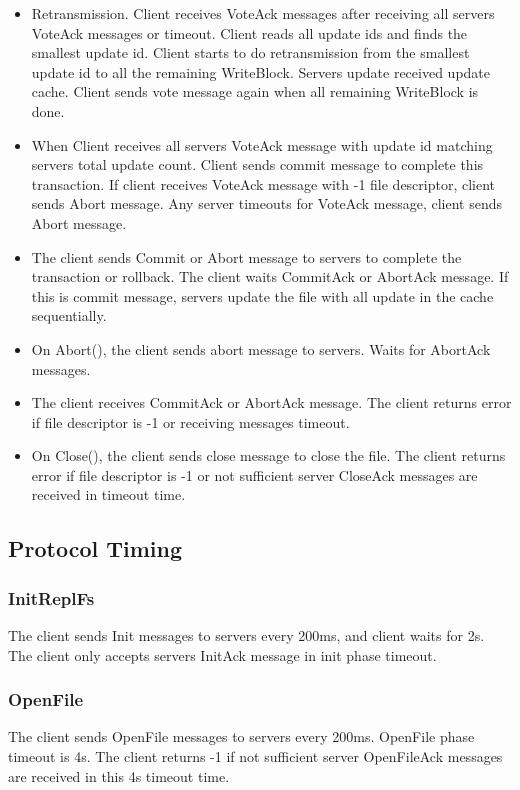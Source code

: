 \documentclass[12pt,fleqn]{article}
\begin{document}
\begin{itemize}
	\item Retransmission. Client receives VoteAck messages after receiving all servers VoteAck messages or timeout. Client reads all update ids and finds the smallest update id. Client starts to do retransmission from the smallest update id to all the remaining WriteBlock. Servers update received update cache. Client sends vote message again when all remaining WriteBlock is done.
	\item When Client receives all servers VoteAck message with update id matching servers total update count. Client sends commit message to complete this transaction. If client receives VoteAck message with -1 file descriptor, client sends Abort message. Any server timeouts for VoteAck message, client sends Abort message.
	\item The client sends Commit or Abort message to servers to complete the transaction or rollback. The client waits CommitAck or AbortAck message. If this is commit message, servers update the file with all update in the cache sequentially.
	\item On Abort(), the client sends abort message to servers. Waits for AbortAck messages.
	\item The client receives CommitAck or AbortAck message. The client returns error if file descriptor is -1 or receiving messages timeout. 
	\item On Close(), the client sends close message to close the file. The client returns error if file descriptor is -1 or not sufficient server CloseAck messages are received in timeout time.
\end{itemize}

\subsection{Protocol Timing}
\subsubsection{InitReplFs}
The client sends Init messages to servers every 200ms, and client waits for 2s. The client only accepts servers InitAck message in init phase timeout. 

\subsubsection{OpenFile}
The client sends OpenFile messages to servers every 200ms. OpenFile phase timeout is 4s. The client returns -1 if not sufficient server OpenFileAck messages are received in this 4s timeout time.
\end{document}
